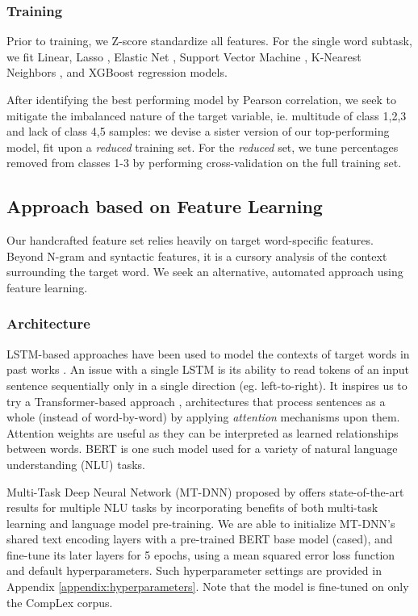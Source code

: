 \documentclass[11pt,a4paper]{article}
\begin{document}
\subsubsection{Training}

Prior to training, we Z-score standardize all features. For the single word subtask, we fit Linear, Lasso \citep{tibshirani1996regression}, Elastic Net \citep{zou2005regularization}, Support Vector Machine \citep{platt1999probabilistic}, K-Nearest Neighbors \citep{wiki:K-nearest_neighbors_algorithm}, and XGBoost \citep{chen2016xgboost} regression models. 

After identifying the best performing model by Pearson correlation, we seek to mitigate the imbalanced nature of the target variable, ie. multitude of class 1,2,3 and lack of class 4,5 samples: we devise a sister version of our top-performing model, fit upon a \textit{reduced} training set. For the \textit{reduced} set, we tune percentages removed from classes 1-3 by performing cross-validation on the full  training set.

\subsection{Approach based on Feature Learning}

Our handcrafted feature set relies heavily on target word-specific features. Beyond N-gram and syntactic features, it is a cursory analysis of the context surrounding the target word. We seek an alternative, automated approach using feature learning.

\subsubsection{Architecture}

LSTM-based approaches have been used to model the contexts of target words in past works \citep{hartmann2018nilc, de2018deep}. An issue with a single LSTM is its ability to read tokens of an input sentence sequentially only in a single direction (eg. left-to-right). It inspires us to try a Transformer-based approach \citep{vaswani2017attention}, architectures that process sentences as a whole (instead of word-by-word) by applying \textit{attention} mechanisms upon them. Attention weights are useful as they can be interpreted as learned relationships between words. BERT \citep{devlin2018bert} is one such model used for a variety of natural language understanding (NLU) tasks.

Multi-Task Deep Neural Network (MT-DNN) proposed by \citet{liu2019multi} offers state-of-the-art results for multiple NLU tasks by incorporating benefits of both multi-task learning and language model pre-training. We are able to initialize MT-DNN's shared text encoding layers with a pre-trained BERT base model (cased), and fine-tune its later layers for 5 epochs, using a mean squared error loss function and default hyperparameters. Such hyperparameter settings are provided in Appendix \ref{appendix:hyperparameters}. Note that the model is fine-tuned on only the CompLex corpus.
\end{document}
